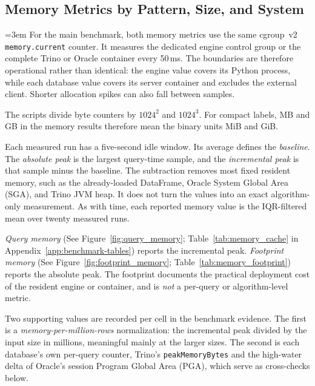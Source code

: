 \subsection{Memory Metrics by Pattern, Size, and System}
\label{subsec:eval-memory}

\begingroup\emergencystretch=3em
For the main benchmark, both memory metrics use the same cgroup~v2
\texttt{memory.current} counter.  It measures the dedicated engine
control group or the complete Trino or Oracle container every 50\,ms.
The boundaries are therefore operational rather than identical: the
engine value covers its Python process, while each database value
covers its server container and excludes the external client.  Shorter
allocation spikes can also fall between samples.\par\endgroup

The scripts divide byte counters by $1024^2$ and $1024^3$.  For compact
labels, MB and GB in the memory results therefore mean the binary units
MiB and GiB.

Each measured run has a five-second idle window.  Its average defines
the \emph{baseline}.  The \emph{absolute peak} is the largest query-time
sample, and the \emph{incremental peak} is that sample minus the
baseline.  The subtraction removes most fixed resident memory, such as
the already-loaded DataFrame, Oracle System Global Area (SGA), and
Trino JVM heap.  It does
not turn the values into an exact algorithm-only measurement.  As with
time, each reported memory value is the IQR-filtered mean over twenty
measured runs.

\emph{Query memory} (See Figure~\ref{fig:query_memory};
Table~\ref{tab:memory_cache} in Appendix~\ref{app:benchmark-tables})
reports the incremental peak.  \emph{Footprint memory}
(See Figure~\ref{fig:footprint_memory}; Table~\ref{tab:memory_footprint})
reports the absolute peak.  The footprint documents the practical
deployment cost of the resident engine or container, and is \emph{not} a
per-query or algorithm-level metric.

Two supporting values are recorded per cell in the benchmark evidence.
The first is a \emph{memory-per-million-rows} normalization: the
incremental peak divided by the input size in millions, meaningful
mainly at the larger sizes.  The second is each database's own per-query
counter, Trino's \texttt{peakMemoryBytes} and the high-water delta of
Oracle's session Program Global Area (PGA), which serve as cross-checks
below.

